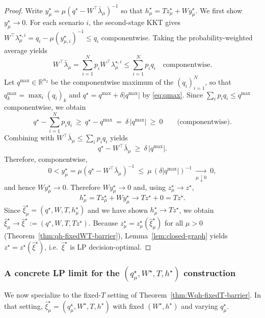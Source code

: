 \documentclass[11pt]{article}
\theoremstyle{plain}
\theoremstyle{definition}
\theoremstyle{remark}
\begin{document}
\begin{proof}
Write $y_\mu^\star=\mu(q^\star-W^\top\bar\lambda_\mu)^{-1}$ so that $h_\mu^\star=Tz_\mu^\star+Wy_\mu^\star$.
We first show $y_\mu^\star\to 0$.
For each scenario $i$, the second-stage KKT gives $W^\top\lambda_{\mu}^{\star,i}=q_i-\mu(y_{\mu,i}^\star)^{-1}\le q_i$ componentwise.
Taking the probability-weighted average yields
\[
W^\top\bar\lambda_\mu=\sum_{i=1}^N p_i W^\top\lambda_{\mu}^{\star,i} \le \sum_{i=1}^N p_i q_i \quad\text{componentwise}.
\]
Let $q^{\max}\in\mathbb{R}^{n_2}$ be the componentwise maximum of the $(q_i)_{i=1}^N$, so that
$q^{\max}_k=\max_i(q_i)_k$ and $q^\star=q^{\max}+\delta|q^{\max}|$ by \eqref{eq:qmax}.
Since $\sum_i p_i q_i \le q^{\max}$ componentwise, we obtain
\[
q^\star - \sum_{i=1}^N p_i q_i \ \ge\ q^\star-q^{\max} \ =\ \delta\,|q^{\max}| \ \ge\ 0
\qquad\text{(componentwise)}.
\]
Combining with $W^\top\bar\lambda_\mu \le \sum_i p_i q_i$ yields
\[
q^\star - W^\top\bar\lambda_\mu \ \ge\ \delta\,|q^{\max}|.
\]
Therefore, componentwise,
\[
0<y_\mu^\star=\mu(q^\star-W^\top\bar\lambda_\mu)^{-1}
\ \le\ \mu\,(\delta|q^{\max}|)^{-1}
\ \xrightarrow[\mu\downarrow 0]{}\ 0,
\]
and hence $Wy_\mu^\star\to 0$.
Therefore $Wy_\mu^\star\to 0$ and, using $z_\mu^\star\to z^\star$,
\[
h_\mu^\star=Tz_\mu^\star+Wy_\mu^\star \to Tz^\star+0 = Tz^\star.
\]
Since $\hat\xi_\mu^\star=(q^\star,W,T,h_\mu^\star)$ and we have shown $h_\mu^\star\to Tz^\star$,
we obtain $\hat\xi_\mu^\star\to \hat\xi^\star:=(q^\star,W,T,Tz^\star)$.
Because $z_\mu^\star=z_\mu^\star(\hat\xi_\mu^\star)$ for all $\mu>0$
(Theorem~\ref{thm:qh-fixedWT-barrier}), Lemma~\ref{lem:closed-graph} yields
$z^\star=z^\star(\hat\xi^\star)$, i.e.\ $\hat\xi^\star$ is LP decision-optimal.
\end{proof}

\subsubsection[A concrete LP limit for the (q mu*, W*, T, h*) construction]{A concrete LP limit for the $(q_\mu^\star,W^\star,T,h^\star)$ construction}\label{subsec:Wqh-limit-LP}

We now specialize to the fixed-$T$ setting of Theorem~\ref{thm:Wqh-fixedT-barrier}.
In that setting, $\hat\xi_\mu^\star=(q_\mu^\star,W^\star,T,h^\star)$ with fixed $(W^\star,h^\star)$ and varying $q_\mu^\star$.
\end{document}
